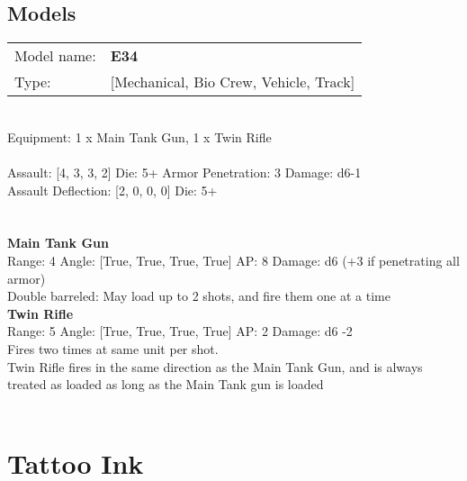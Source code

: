 \pagebreak

\subsection{ Models }

\begin{tabular}{ll}
Model name: & {\bf E34 } \\
Type: & [Mechanical, Bio Crew, Vehicle, Track] \\
\end{tabular}
\ \\
Equipment: 1 x Main Tank Gun, 1 x Twin Rifle \\
\ \\
Assault: [4, 3, 3, 2] Die: 5+ Armor Penetration: 3 Damage: d6-1 \\
Assault Deflection: [2, 0, 0, 0] Die: 5+\\
\indent  
\ \\

\ \\
{\bf Main Tank Gun } \\



Range: 4  Angle: [True, True, True, True] AP: 8 Damage: d6 (+3 if penetrating all armor) \\
Double barreled: May load up to 2 shots, and fire them one at a time\\ 




{\bf Twin Rifle } \\



Range: 5  Angle: [True, True, True, True] AP: 2 Damage: d6 -2 \\
Fires two times at same unit per shot.\\Twin Rifle fires in the same direction as the Main Tank Gun, and is always treated as loaded as long as the Main Tank gun is loaded\\ 




 
\ \\














\pagebreak\clearpage

\section{ Tattoo Ink }

